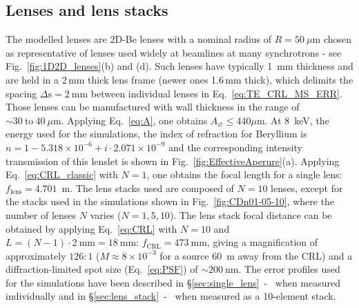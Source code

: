 \begin{refsection}
\section{Lenses and lens stacks}\label{sec:lens_descripiton}
The modelled lenses are 2D-Be lenses with a nominal radius of $R=50~\mu\text{m}$ chosen as representative of lenses used widely at beamlines at many synchrotrons - see Fig.~\ref{fig:1D2D_lenses}(b) and (d). Such lenses have typically 1~mm thickness and are held in a 2\,mm thick lens frame (newer ones 1.6\,mm thick), which delimits the spacing $\Delta\text{s}=2~$mm between individual lenses in Eq.~\ref{eq:TE_CRL_MS_ERR}. Those lenses can be manufactured with wall thickness in the range of $\sim30~\text{to}~40~\mu\text{m}$. Applying Eq.~\ref{eq:A}, one obtains $A_{\diameter}\le440 \mu\text{m}$. At 8~keV, the energy used for the simulations, the index of refraction for Beryllium is $n=1-5.318\times10^{-6}+i\cdot2.071\times10^{-9}$ and the corresponding intensity transmission of this lenslet is shown in Fig.~\ref{fig:EffectiveAperure}(a). Applying Eq.~\ref{eq:CRL_classic} with $N=1$, one obtains the focal length for a single lens: $f_{\text{lens}}=4.701$~m. The lens stacks used are composed of $N=10$ lenses, except for the stacks used in the simulations shown in Fig.~\ref{fig:CDn01-05-10}, where the number of lenses $N$ varies ($N=1,5,10$).  The lens stack focal distance can be obtained by applying Eq.~\ref{eq:CRL} with $N=10$ and $L=(N-1)\cdot2~\text{mm}=18~\text{mm}$: $f_{\text{CRL}}=473~{\text{mm}}$, giving a magnification of approximately $126:1$ ($M\approx8\times10^{-3}$ for a source 60~m away from the CRL) and a diffraction-limited spot size (Eq.~\ref{eq:PSF}) of $\sim200~\text{nm}$. The error profiles used for the simulations have been described in \S\ref{sec:single_lens}~-~\textit{} when measured individually and in \S\ref{sec:lens_stack}~-~\textit{} when measured as a 10-element stack.


\end{refsection}
